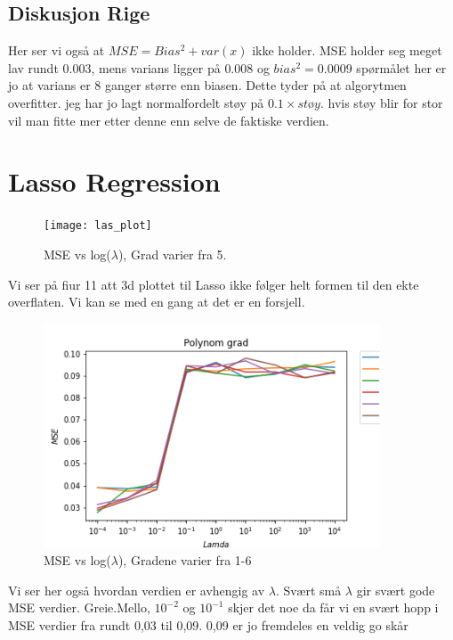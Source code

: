 \documentclass[norsk,a4paper,12pt]{article}
\begin{document}
\subsection*{Diskusjon Rige}

Her ser vi også at $MSE = Bias^2 + var(x)$ ikke holder. MSE holder seg meget lav rundt $0.003$, mens varians ligger på $0.008 $ og  $bias ^2=0.0009$ spørmålet her er jo at varians er 8 ganger større enn biasen. Dette tyder på at algorytmen overfitter. jeg har jo lagt normalfordelt støy på $0.1\times støy$. hvis støy blir for stor vil man fitte mer etter denne enn  selve  de faktiske verdien.


\section*{Lasso Regression}
\begin{figure}[H]
\texttt{[image: las\_plot]}
\caption{MSE vs log($\lambda$), Grad varier fra 5.  }
\end{figure}
Vi ser på fiur 11 att 3d plottet til Lasso ikke følger helt formen til den ekte overflaten. Vi kan se med en gang at det er en forsjell.
\begin{figure}[H]
\includegraphics[width=100mm]{MSE(L)}
\caption{MSE vs log($\lambda$), Gradene varier fra 1-6 }
\end{figure}
Vi ser her også hvordan verdien er avhengig av $\lambda$. Svært små $\lambda$ gir svært  gode MSE verdier. Greie.Mello, $10^{-2} $ og $10^{-1}$ skjer det noe da får vi en svært hopp i MSE verdier fra rundt 0,03 til 0,09. 0,09 er jo fremdeles en veldig go skår 
\end{document}
